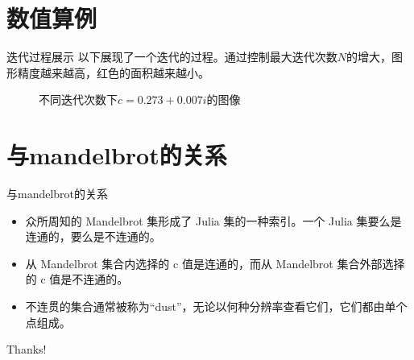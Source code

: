 \documentclass{beamer}
\begin{document}
\section{数值算例}
\begin{frame}{迭代过程展示}
    以下展现了一个迭代的过程。通过控制最大迭代次数$N$的增大，图形精度越来越高，红色的面积越来越小。

\begin{figure}[H]
	\centering
	\caption{不同迭代次数下$c=0.273+0.007i$的图像}
\end{figure}
\end{frame}


\section{与mandelbrot的关系}
\begin{frame}{与mandelbrot的关系}
    \begin{itemize}
        \item 众所周知的 Mandelbrot 集形成了 Julia 集的一种索引。一个 Julia 集要么是连通的，要么是不连通的。\item 从 Mandelbrot 集合内选择的 c 值是连通的，而从 Mandelbrot 集合外部选择的 c 值是不连通的。
        \item 不连贯的集合通常被称为“dust”，无论以何种分辨率查看它们，它们都由单个点组成。
    \end{itemize}
    
\end{frame}
\begin{frame}
    \begin{center}
        {\Huge\calligra Thanks!}
    \end{center}
\end{frame}
\end{document}
